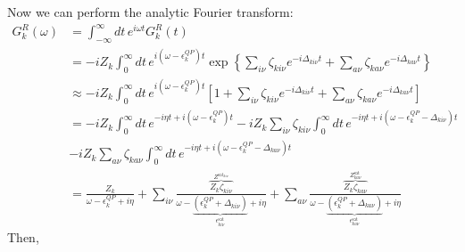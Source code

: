 Now we can perform the analytic Fourier transform:
\begin{align}
    G_k^R(\omega) &= \int_{-\infty}^{\infty} dt\, e^{i\omega t} G_k^R(t) \\
&= -i Z_k \int_0^\infty dt\, e^{i(\omega - \epsilon_k^{QP}) t} \exp\left\{\sum_{i\nu} \zeta_{ki\nu} e^{-i\Delta_{ki\nu} t} + \sum_{a\nu} \zeta_{ka\nu} e^{-i\Delta_{ka\nu} t}\right\} \\
&\approx -i Z_k \int_0^\infty dt\, e^{i(\omega - \epsilon_k^{QP}) t} \left[1 + \sum_{i\nu} \zeta_{ki\nu} e^{-i\Delta_{ki\nu} t} + \sum_{a\nu} \zeta_{ka\nu} e^{-i\Delta_{ka\nu} t}\right] \\
&= -i Z_k \int_0^\infty dt\, e^{-i\eta t + i(\omega - \epsilon_k^{QP}) t} -i Z_k \sum_{i\nu} \zeta_{ki\nu} \int_0^\infty dt\, e^{-i\eta t + i(\omega - \epsilon_k^{QP} - \Delta_{ki\nu}) t}\\ &- i Z_k \sum_{a\nu} \zeta_{ka\nu} \int_0^\infty dt\, e^{-i\eta t + i(\omega - \epsilon_k^{QP} - \Delta_{ka\nu}) t} \\
&= \frac{Z_k}{\omega - \epsilon_k^{QP} + i\eta} + \sum_{i\nu} \frac{\overbrace{Z_k \zeta_{ki\nu}}^{Z^{\text{sat}_{ki\nu}}}}{\omega - \underbrace{\left(\epsilon_k^{QP} + \Delta_{ki\nu}\right)}_{\epsilon^{\text{sat}}_{ki\nu}} + i\eta} + \sum_{a\nu} \frac{\overbrace{Z_k \zeta_{ka\nu}}^{Z^{\text{sat}}_{ka\nu}}}{\omega - \underbrace{\left(\epsilon_k^{QP} + \Delta_{ka\nu}\right)}_{\epsilon^{\text{sat}}_{ka\nu}} + i\eta}
\end{align}
Then,
